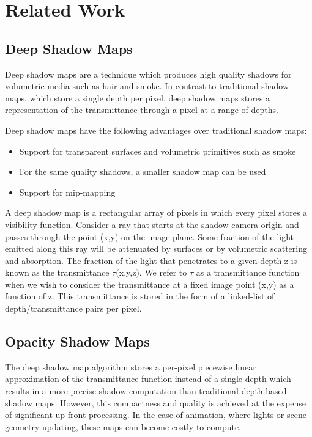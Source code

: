 \documentclass{article}
\begin{document}
\section{Related Work}

\subsection{Deep Shadow Maps}

Deep shadow maps \cite{Lokovic:2000:DSM:344779.344958} are a technique which produces high quality shadows for volumetric media such as hair and smoke. In contrast to traditional shadow maps, which store a single depth per pixel, deep shadow maps stores a representation of the transmittance through a pixel at a range of depths. 

Deep shadow maps have the following advantages over traditional shadow maps:

\begin{itemize}

\item Support for transparent surfaces and volumetric primitives such as smoke
\item For the same quality shadows, a smaller shadow map can be used
\item Support for mip-mapping

\end{itemize}

A deep shadow map is a rectangular array of pixels in which every pixel stores a visibility function. Consider a ray that starts at the shadow camera origin and passes through the point (x,y) on the image plane. Some fraction of the light emitted along this ray will be attenuated by surfaces or by volumetric scattering and absorption. The fraction of the light that penetrates to a given depth z is known as the transmittance $\tau$(x,y,z). We refer to $\tau$ as a transmittance function when we wish to consider the transmittance at a fixed image point (x,y) as a function of z. This transmittance is stored in the form of a linked-list of depth/transmittance pairs per pixel. 

\subsection{Opacity Shadow Maps}

The deep shadow map algorithm stores a per-pixel piecewise linear approximation of the transmittance function instead of a single depth which results in a more precise shadow computation than traditional depth based shadow maps. However, this compactness and quality is achieved at the expense of significant up-front processing. In the case of animation, where lights or scene geometry updating, these maps can become costly to compute.
\end{document}
